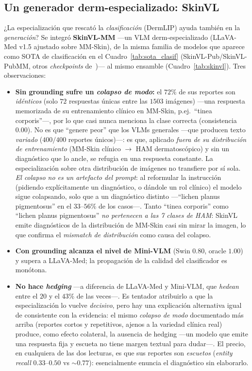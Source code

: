 \documentclass[11pt, a4paper]{article}
\begin{document}
\subsection{Un generador derm-especializado: SkinVL}
\label{sec:skinvl}
¿La especialización que rescató la \emph{clasificación} (DermLIP) ayuda también en la \emph{generación}?
Se integró \textbf{SkinVL-MM} —un VLM derm-especializado (LLaVA-Med v1.5 ajustado sobre MM-Skin), de la
misma familia de modelos que aparece como SOTA de clasificación en el Cuadro~\ref{tab:sota_clasif}
(SkinVL-Pub/SkinVL-PubMM, otros \emph{checkpoints} de~\cite{zeng2025mmskin})— al mismo
ensamble (Cuadro~\ref{tab:skinvl}). Tres observaciones:
\begin{itemize}[leftmargin=1.6em]
  \item \textbf{Sin grounding sufre un \emph{colapso de modo}:} el $72\%$ de sus reportes son
  \emph{idénticos} (solo $72$ respuestas únicas entre las $1503$ imágenes) —una respuesta memorizada de
  su entrenamiento clínico en MM-Skin, p.ej.\ ``tinea corporis''—, por lo que casi nunca menciona la
  clase correcta (consistencia $0.00$). No es que ``genere peor'' que los VLMs generales —que producen
  texto \emph{variado} ($400/400$ reportes únicos)—: es que, aplicado \emph{fuera de su distribución de
  entrenamiento} (MM-Skin clínico $\to$ HAM dermatoscópico) y sin un diagnóstico que lo ancle, se refugia
  en una respuesta constante. La especialización sobre otra distribución de imágenes no transfiere por sí
  sola. \emph{El colapso no es un artefacto del prompt}: al reformular la instrucción (pidiendo
  explícitamente un diagnóstico, o dándole un rol clínico) el modelo sigue colapsando, solo que a un
  diagnóstico distinto —``lichen planus pigmentosus'' en el $33$--$56\%$ de los casos—. Tanto ``tinea
  corporis'' como ``lichen planus pigmentosus'' \emph{no pertenecen a las 7 clases de HAM}: SkinVL emite
  diagnósticos de la distribución de MM-Skin casi sin mirar la imagen, lo que confirma el \emph{mismatch de
  distribución} como causa del colapso.
  \item \textbf{Con grounding alcanza el nivel de Mini-VLM} (Swin $0.80$, oracle $1.00$) y supera a
  LLaVA-Med; la propagación de la calidad del clasificador es monótona.
  \item \textbf{No hace \emph{hedging}} —a diferencia de LLaVA-Med y Mini-VLM, que \emph{hedean} entre el $20$ y
  el $43\%$ de las veces—. Es tentador atribuirlo a que la especialización lo vuelve \emph{decisivo}, pero
  hay una explicación alternativa igual de consistente con la evidencia: el mismo \emph{colapso de modo}
  documentado más arriba (reportes cortos y repetitivos, ajenos a la variedad clínica real) produce, como
  efecto colateral, la ausencia de hedging —un modelo que emite una respuesta fija y escueta no tiene
  margen textual para dudar—. El precio, en cualquiera de las dos lecturas, es que sus reportes son
  \emph{escuetos} (\emph{entity recall} $0.33$–$0.50$ vs $\sim0.77$): esencialmente enuncia el diagnóstico
  sin elaborarlo.
\end{itemize}
\end{document}
